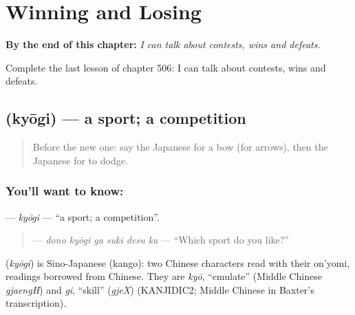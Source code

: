 
\chapter{Winning and Losing}
\label{ch:ja-winning-and-losing}

\begin{chapteropening}
\textbf{By the end of this chapter:} \emph{I can talk about contests, wins and defeats.}

Complete the last lesson of chapter 506: I can talk about contests, wins and defeats.
\end{chapteropening}

\section[\texorpdfstring{\ja{きょうぎ} (kyōgi)}{きょうぎ (kyōgi)}]{ (kyōgi) — a sport; a competition}

\label{lesson:JA-C506-kyougi}



\begin{quote}
Before the new one: say the Japanese for a bow (for arrows), then the Japanese for to dodge.
\end{quote}

\subsection*{You'll want to know: }
\textbf{} — \emph{kyōgi} — \textquotedblleft{}a sport; a competition\textquotedblright{}.

\begin{quote}
\textbf{  } — \emph{dono kyōgi ga suki desu ka} — \textquotedblleft{}Which sport do you like?\textquotedblright{}
\end{quote}

\begin{cousinweb}
\textbf{} (\emph{kyōgi}) is Sino-Japanese (kango): two Chinese characters read with their on'yomi, readings borrowed from Chinese. They are \emph{kyō}, \textquotedblleft{}emulate\textquotedblright{} (Middle Chinese \emph{gjaengH}) and \emph{gi}, \textquotedblleft{}skill\textquotedblright{} (\emph{gjeX}) (KANJIDIC2; Middle Chinese in Baxter's transcription).
\end{cousinweb}

